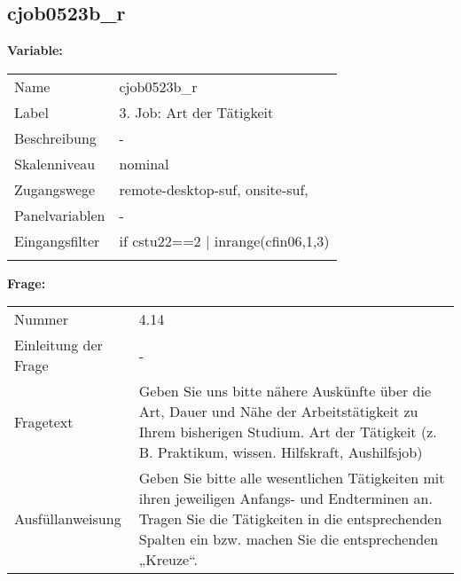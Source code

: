 	
	
	\subsection{cjob0523b\_r}
	\label{subSection:cjob0523b_r}

	\noindent\textbf{Variable:}\\
		\begin{tabular}{lL{11.3cm}}
			\label{tableVariable:cjob0523b_r}
			Name & cjob0523b\_r \\
			Label & 3. Job: Art der Tätigkeit \\
			Beschreibung & - \\
			Skalenniveau & nominal \\
			Zugangswege &
				remote-desktop-suf,
				onsite-suf,
 \\
			Panelvariablen & -
			 \\
			Eingangsfilter & if cstu22==2 | inrange(cfin06,1,3) \\
 \\
		\end{tabular}

		\vspace*{1 cm}
		\noindent\textbf{Frage:}\\
		\begin{tabular}{lL{11.3cm}}
			\label{tableQuestion:cjob0523b_r}
			Nummer & 4.14 \\
			Einleitung der Frage & - \\
			Fragetext & Geben Sie uns bitte nähere Auskünfte über die Art, Dauer und Nähe der Arbeitstätigkeit zu Ihrem bisherigen Studium.
Art der Tätigkeit
(z. B. Praktikum, wissen. Hilfskraft, Aushilfsjob) \\
			Ausfüllanweisung & Geben Sie bitte alle wesentlichen Tätigkeiten mit ihren jeweiligen Anfangs- und Endterminen an. Tragen Sie die Tätigkeiten in die entsprechenden Spalten ein bzw. machen Sie die entsprechenden „Kreuze“. \\
		\end{tabular}





